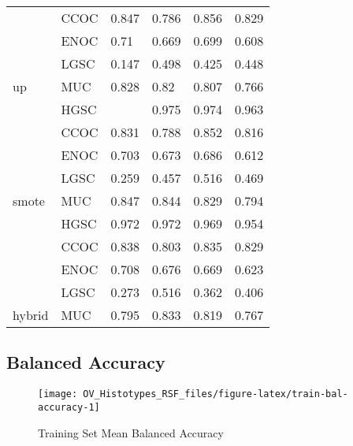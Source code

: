 \documentclass[
]{report}
\begin{document}
\begin{table}
\begin{tabular}[t]{l|l|l|l|l|l}
\cline{2-6}
 & CCOC & 0.847 & 0.786 & 0.856 & 0.829\\
\cline{2-6}
 & ENOC & 0.71 & 0.669 & 0.699 & 0.608\\
\cline{2-6}
 & LGSC & 0.147 & 0.498 & 0.425 & 0.448\\
\cline{2-6}
\multirow{-5}{*}{\raggedright\arraybackslash up} & MUC & 0.828 & 0.82 & 0.807 & 0.766\\
\cline{1-6}
 & HGSC & \cellcolor[HTML]{90ee90}{0.977} & 0.975 & 0.974 & 0.963\\
\cline{2-6}
 & CCOC & 0.831 & 0.788 & 0.852 & 0.816\\
\cline{2-6}
 & ENOC & 0.703 & 0.673 & 0.686 & 0.612\\
\cline{2-6}
 & LGSC & 0.259 & 0.457 & 0.516 & 0.469\\
\cline{2-6}
\multirow{-5}{*}{\raggedright\arraybackslash smote} & MUC & 0.847 & 0.844 & 0.829 & 0.794\\
\cline{1-6}
 & HGSC & 0.972 & 0.972 & 0.969 & 0.954\\
\cline{2-6}
 & CCOC & 0.838 & 0.803 & 0.835 & 0.829\\
\cline{2-6}
 & ENOC & 0.708 & 0.676 & 0.669 & 0.623\\
\cline{2-6}
 & LGSC & 0.273 & 0.516 & 0.362 & 0.406\\
\cline{2-6}
\multirow{-5}{*}{\raggedright\arraybackslash hybrid} & MUC & 0.795 & 0.833 & 0.819 & 0.767\\
\hline
\end{tabular}
\end{table}

\subsection{Balanced Accuracy}\label{balanced-accuracy-1}

\begin{figure}[H]

{\centering \texttt{[image: OV\_Histotypes\_RSF\_files/figure-latex/train-bal-accuracy-1]} 

}

\caption{Training Set Mean Balanced Accuracy}\label{fig:train-bal-accuracy}
\end{figure}
\end{document}
